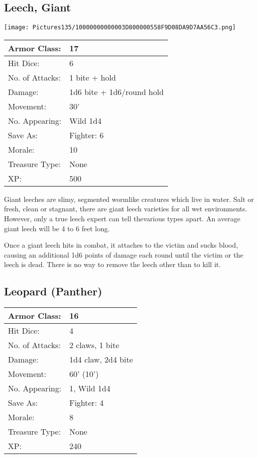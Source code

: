 \documentclass[a4paper,twoside,openany,10pt]{book}
\begin{document}
\begin{multicols}{2}
\subsection*{Leech, Giant}\label{leech-giant}


\begin{center} \texttt{[image: Pictures135/10000000000003D800000558F9D08DA9D7AA56C3.png]} \end{center}

\begin{flushleft}
	\begin{tabularx}{0.50\textwidth}{@{}lX@{}}
Armor Class: & 17 \\\hline
Hit Dice: & 6 \\\hline
No. of Attacks: & 1 bite + hold \\\hline
Damage: & 1d6 bite + 1d6/round hold \\\hline
Movement: & 30' \\\hline
No. Appearing: & Wild 1d4 \\\hline
Save As: & Fighter: 6 \\\hline
Morale: & 10 \\\hline
Treasure Type: & None \\\hline
XP: & 500 \\\hline
\end{tabularx}\medskip
\end{flushleft}

Giant leeches are slimy, segmented wormlike creatures which live in water. Salt or fresh, clean or stagnant, there are giant leech varieties for all wet environments. However, only a true leech expert can tell thevarious types apart. An average giant leech will be 4 to 6 feet long.

Once a giant leech hits in combat, it attaches to the victim and sucks blood, causing an additional 1d6 points of damage each round until the victim or the leech is dead. There is no way to remove the leech other than to kill it.


\subsection*{Leopard (Panther)}\label{leopard-panther}

\begin{tabularx}{0.50\textwidth}{@{}lX@{}}
Armor Class: & 16 \\\hline
Hit Dice: & 4 \\\hline
No. of Attacks: & 2 claws, 1 bite \\\hline
Damage: & 1d4 claw, 2d4 bite \\\hline
Movement: & 60' (10') \\\hline
No. Appearing: & 1, Wild 1d4 \\\hline
Save As: & Fighter: 4 \\\hline
Morale: & 8 \\\hline
Treasure Type: & None \\\hline
XP: & 240 \\\hline
\end{tabularx}\medskip


\end{multicols}
\end{document}
